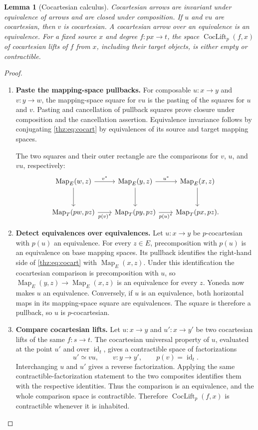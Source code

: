 \documentclass[oneside]{article}
\theoremstyle{plain}
\newtheorem{lemma}[theorem]{Lemma}
\theoremstyle{definition}
\theoremstyle{remark}
\newcommand{\Map}{\operatorname{Map}}
\newcommand{\id}{\operatorname{id}}
\begin{document}
\begin{lemma}[Cocartesian calculus]\label{thz:lem:cocart-calculus}
Cocartesian arrows are invariant under equivalence of arrows and are closed
under composition.  If $u$ and $vu$ are cocartesian, then $v$ is
cocartesian.  A cocartesian arrow over an equivalence is an equivalence.
For a fixed source $x$ and degree $f:px\to t$, the space
$\operatorname{CocLift}_p(f,x)$ of cocartesian lifts of $f$ from $x$,
including their target objects, is either empty or contractible.
\end{lemma}
\begin{proof}
\leavevmode
\begin{enumerate}
\item \textbf{Paste the mapping-space pullbacks.} For composable $u:x\to y$ and $v:y\to w$, the mapping-space square for
$vu$ is the pasting of the squares for $u$ and $v$.  Pasting and
cancellation of pullback squares prove closure under composition and the
cancellation assertion.  Equivalence invariance follows by conjugating
\eqref{thz:eq:cocart} by equivalences of its source and target mapping
spaces.
\begin{samepage}
The two squares and their outer rectangle are the comparisons
for $v$, $u$, and $vu$, respectively:
\[
\begin{tikzcd}[column sep=2em,row sep=large]
 \Map_E(w,z)\ar[r,"v^*"]\ar[d]&
 \Map_E(y,z)\ar[r,"u^*"]\ar[d]&\Map_E(x,z)\ar[d]\\
 \Map_T(pw,pz)\ar[r,"p(v)^*"']&
 \Map_T(py,pz)\ar[r,"p(u)^*"']&\Map_T(px,pz).
\end{tikzcd}
\]
\end{samepage}
\item \textbf{Detect equivalences over equivalences.} Let $u:x\to y$ be
$p$-cocartesian with $p(u)$ an equivalence. For every $z\in E$,
precomposition with $p(u)$ is an equivalence on base mapping spaces.
Its pullback identifies the right-hand side of \eqref{thz:eq:cocart}
with $\Map_E(x,z)$. Under this identification the cocartesian comparison
is precomposition with $u$, so $\Map_E(y,z)\to\Map_E(x,z)$ is an
equivalence for every $z$. Yoneda now makes $u$ an equivalence.
Conversely, if $u$ is an equivalence, both horizontal maps in its
mapping-space square are equivalences. The square is therefore a
pullback, so $u$ is $p$-cocartesian.
\item \textbf{Compare cocartesian lifts.} Let $u:x\to y$ and $u':x\to y'$ be two cocartesian lifts of the same
$f:s\to t$.  The cocartesian universal property of $u$, evaluated at the
point $u'$ and over $\id_t$, gives a contractible space of
factorizations
\[
 u'\simeq vu,\qquad v:y\to y',\qquad p(v)=\id_t.
\]
Interchanging $u$ and $u'$ gives a reverse factorization.  Applying the
same contractible-factorization statement to the two composites identifies
them with the respective identities.  Thus the comparison is an
equivalence, and the whole comparison space is contractible.  Therefore
$\operatorname{CocLift}_p(f,x)$ is contractible whenever it is inhabited.\qedhere
\end{enumerate}
\end{proof}
\end{document}

